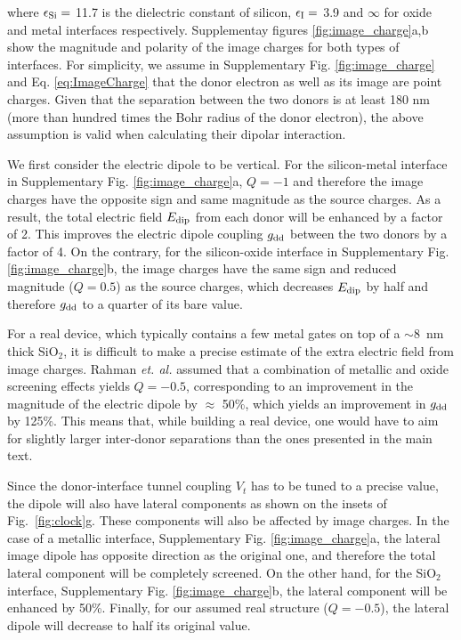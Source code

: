 \documentclass[aps,prb,superscriptaddress,nobibnotes,twocolumn]{revtex4-1}
\begin{document}
where $\epsilon_{\rm Si} =$ 11.7 is the dielectric constant of silicon,  $\epsilon_{\rm I} =$ 3.9 and  $\infty$  for oxide and metal interfaces respectively. Supplementay figures \ref{fig:image_charge}a,b show the magnitude and polarity of the image charges for both types of interfaces. For simplicity, we assume in Supplementary Fig. \ref{fig:image_charge} and Eq. \ref{eq:ImageCharge} that the donor electron as well as its image are point charges. Given that the separation between the two donors is at least 180 nm (more than hundred times the Bohr radius of the donor electron), the above assumption is valid when calculating their dipolar interaction. 

We first consider the electric dipole to be vertical. For the silicon-metal interface in Supplementary Fig. \ref{fig:image_charge}a, $Q=-1$ and therefore the image charges have the opposite sign and same magnitude as the source charges. As a result, the total electric field  $E_{\rm dip}$ from each donor will be enhanced by a factor of 2. This improves the electric dipole coupling $g_{\rm dd}$ between the two donors by a factor of 4. On the contrary, for the silicon-oxide interface in Supplementary Fig. \ref{fig:image_charge}b, the image charges have the same sign and reduced magnitude ($Q=0.5$) as the source charges, which decreases $E_{\rm dip}$ by half and therefore $g_{\rm dd}$ to a quarter of its bare value.

For a real device, which typically contains a few metal gates on top of a $\sim8$~nm thick SiO$_2$, it is difficult to make a precise estimate of the extra electric field from image charges. Rahman \textit{et. al.} \cite{Rahman2009S} assumed that a combination of metallic and oxide screening effects yields $Q=-0.5$, corresponding to an improvement in the magnitude of the electric dipole by $\approx$ 50\%, which yields an improvement in $g_{\rm dd}$ by 125\%. 
This means that, while building a real device, one would have to aim for slightly larger inter-donor separations than the ones presented in the main text.

Since the donor-interface tunnel coupling $V_t$ has to be tuned to a precise value, the dipole will also have lateral components as shown on the insets of Fig.~\ref{fig:clock}g. These components will also be affected by image charges. In the case of a metallic interface, Supplementary Fig. \ref{fig:image_charge}a, the lateral image dipole has opposite direction as the original one, and therefore the total lateral component will be completely screened. On the other hand, for the SiO$_2$ interface, Supplementary Fig. \ref{fig:image_charge}b, the lateral component will be enhanced by 50\%. Finally, for our assumed real structure ($Q=-0.5$), the lateral dipole will decrease to half its original value.
\end{document}
